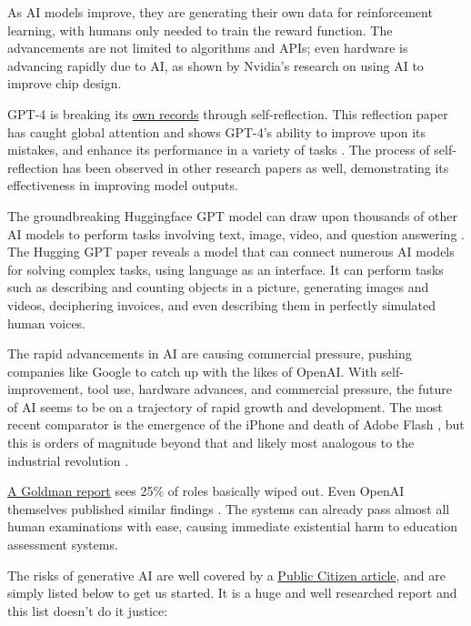 As AI models improve, they are generating their own data for reinforcement learning, with humans only needed to train the reward function. The advancements are not limited to algorithms and APIs; even hardware is advancing rapidly due to AI, as shown by Nvidia's research on using AI to improve chip design.\par
GPT-4 is breaking its \href{https://nanothoughts.substack.com/p/reflecting-on-reflexion}{own records} through self-reflection. This reflection paper has caught global attention and shows GPT-4's ability to improve upon its mistakes, and enhance its performance in a variety of tasks \cite{shinn2023reflexion}. The process of self-reflection has been observed in other research papers as well, demonstrating its effectiveness in improving model outputs.\par
The groundbreaking Huggingface GPT model can draw upon thousands of other AI models to perform tasks involving text, image, video, and question answering \cite{shen2023hugginggpt}. The Hugging GPT paper reveals a model that can connect numerous AI models for solving complex tasks, using language as an interface. It can perform tasks such as describing and counting objects in a picture, generating images and videos, deciphering invoices, and even describing them in perfectly simulated human voices.\par
The rapid advancements in AI are causing commercial pressure, pushing companies like Google to catch up with the likes of OpenAI. With self-improvement, tool use, hardware advances, and commercial pressure, the future of AI seems to be on a trajectory of rapid growth and development. The most recent comparator is the emergence of the iPhone and death of Adobe Flash \cite{horton2019death}, but this is orders of magnitude beyond that and likely most analogous to the industrial revolution \cite{trajtenberg2018ai}. \par 
\href{https://www.key4biz.it/wp-content/uploads/2023/03/Global-Economics-Analyst_-The-Potentially-Large-Effects-of-Artificial-Intelligence-on-Economic-Growth-Briggs_Kodnani.pdf}{A Goldman report} sees 25\% of roles basically wiped out. Even OpenAI themselves published similar findings \cite{eloundou2023gpts}. The systems can already pass almost all human examinations with ease, causing immediate existential harm to education assessment systems.\par 
The risks of generative AI are well covered by a \href{https://www.citizen.org/article/sorry-in-advance-generative-ai-artificial-intellligence-chatgpt-report/}{Public Citizen article}, and are simply listed below to get us started. It is a huge and well researched report and this list doesn't do it justice:
